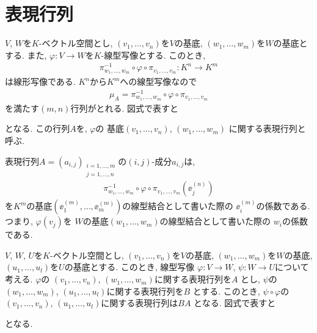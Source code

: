 \section{表現行列}
$V$, $W$を$K$-ベクトル空間とし,
$(v_1,\ldots,v_n)$を$V$の基底,
$(w_1,\ldots,w_m)$を$W$の基底とする.
また,
$\varphi\colon V\to W$を$K$-線型写像とする.
このとき,
\begin{align*}
  \pi^{-1}_{w_1,\ldots,w_m}\circ \varphi \circ \pi_{v_1,\ldots,v_m}
  \colon K^n\to K^m
\end{align*}
は線形写像である. 
$K^n$から$K^m$への線型写像なので
\begin{align*}
  \mu_{A}=\pi^{-1}_{w_1,\ldots,w_m}\circ \varphi \circ \pi_{v_1,\ldots,v_m}
\end{align*}
を満たす$(m,n)$行列がとれる.
図式で表すと
\begin{center}
\end{center}
となる.
この行列$A$を,
$\varphi$の
基底$(v_1,\ldots,v_n)$,
$(w_1,\ldots,w_m)$
に関する表現行列と呼ぶ.
\begin{remark}
表現行列$A=(a_{i,j})_{\substack{i=1,\ldots,m\\j=1,\ldots,n}}$の$(i,j)$-成分$a_{i,j}$は,
\begin{align*}
  \pi^{-1}_{w_1,\ldots,w_m}\circ \varphi \circ \pi_{v_1,\ldots,v_m}
  (\ee_j^{(n)})
\end{align*}
を$K^m$の基底$(\ee_1^{(m)},\ldots,\ee_m^{(m)})$の線型結合として書いた際の
$\ee_i^{(m)}$の係数である.
つまり,
$\varphi(v_j)$を
$W$の基底$(w_1,\ldots,w_m)$の線型結合として書いた際の
$w_i$の係数である.
\end{remark}
\begin{prop}
$V$, $W$, $U$を$K$-ベクトル空間とし,
$(v_1,\ldots,v_n)$を$V$の基底,
$(w_1,\ldots,w_m)$を$W$の基底,
$(u_1,\ldots,u_l)$を$U$の基底とする.
このとき, 線型写像
$\varphi\colon V\to W$,
$\psi\colon W\to U$について考える.
$\varphi$の
$(v_1,\ldots,v_n)$,
$(w_1,\ldots,w_m)$に関する表現行列を$A$
とし,
$\psi$の
$(w_1,\ldots,w_m)$,
$(u_1,\ldots,u_l)$に関する表現行列を$B$
とする.
このとき,
$\psi\circ \varphi$の
$(v_1,\ldots,v_n)$,
$(u_1,\ldots,u_l)$に関する表現行列は$BA$
となる.
図式で表すと
\begin{center}
\end{center}
となる.
\end{prop}

